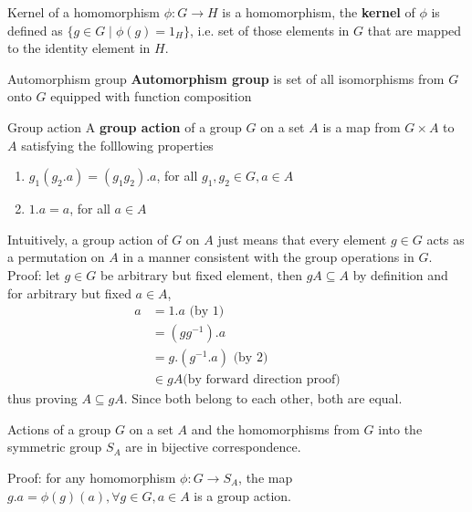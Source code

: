\documentclass[titlepage, 12pt]{article}
\begin{document}
\begin{definition}{Kernel of a homomorphism}{}
$\phi:G\rightarrow H$ is a homomorphism, the \textbf{kernel} of $\phi$ is
defined as $\{g\in G\mid\phi(g) = 1_H\}$, i.e. set of those elements in $G$ that
are mapped to the identity element in $H$.
\end{definition}

\begin{definition}{Automorphism group}{}
\textbf{Automorphism group} is set of all isomorphisms from $G$ onto $G$
equipped with function composition
\end{definition}

\begin{definition}{Group action}{}
A \textbf{group action} of a group $G$ on a set $A$ is a
map from $G\times A$ to $A$ satisfying the folllowing properties
\begin{enumerate}

    \item $g_1(g_2.a) = (g_1g_2).a$, for all $g_1, g_2\in G, a\in A$

    \item $1.a = a$, for all $a\in A$

\end{enumerate}
\end{definition}

Intuitively, a group action of $G$ on $A$ just means that every element $g\in G$
acts as a permutation on $A$ in a manner consistent with the group operations in
$G$. Proof: let $g\in G$ be arbitrary but fixed element, then $gA\subseteq
A$ by definition and for arbitrary but fixed $a\in A$,
\begin{align*}
    a &= 1 . a \textrm{ (by 1)}\\
      &= (gg^{-1}) . a\\
      &= g . (g^{-1} . a) \textrm{ (by 2)}\\
      &\in gA  \textrm{(by forward direction proof)}
\end{align*}
thus proving $A\subseteq gA$. Since both belong to each other, both are equal.

\begin{proposition}{}{}
Actions of a group $G$ on a set $A$ and the homomorphisms from $G$ into the
symmetric group $S_A$ are in bijective correspondence.
\end{proposition}
Proof: for any homomorphism $\phi: G\rightarrow S_A$, the map $g . a =
\phi(g)(a), \forall g\in G, a\in A$ is a group action.
\end{document}
